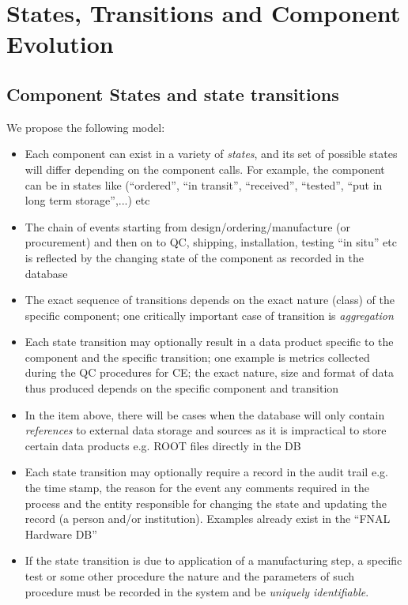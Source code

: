 \documentclass[pdftex,12pt,letter]{article}
\begin{document}
\section{States, Transitions and Component Evolution}

\subsection{Component States and state transitions}

We propose the following model:

\begin{itemize}

\item Each component can exist in a variety of \textit{states}, and its set of possible states will differ depending on
the component calls. For example, the component can be in states like (``ordered'', ``in transit'', ``received'', ``tested'', ``put in long term storage'',...) etc

\item The chain of events starting from design/ordering/manufacture (or procurement) and then on to QC,
shipping, installation, testing ``in situ'' etc is reflected by the changing state of the component as recorded
in the database

\item The exact sequence of transitions depends on the exact nature (class) of the specific  component; one
critically important case of transition is \textit{aggregation}

\item Each state transition may optionally result in a data product specific to the component and the specific transition;
one example is metrics collected during the QC procedures for CE; the exact nature, size and format of data thus produced
depends on the specific component and transition

\item In the item above, there will be cases when the database will only contain \textit{references} to external data storage
and sources as it is impractical to store certain data products e.g. ROOT files directly in the DB

\item Each state transition may optionally require a record in the audit trail e.g.\,the time stamp, the reason for the event
any comments required in the process and the entity responsible for changing the state and updating the record
(a person and/or institution). Examples already exist in the ``FNAL Hardware DB''

\item If the state transition is due to application of a manufacturing step, a specific test or some other procedure
the nature and the parameters of such procedure must be recorded in the system and be \textit{uniquely identifiable}.

\end{itemize}
\end{document}
